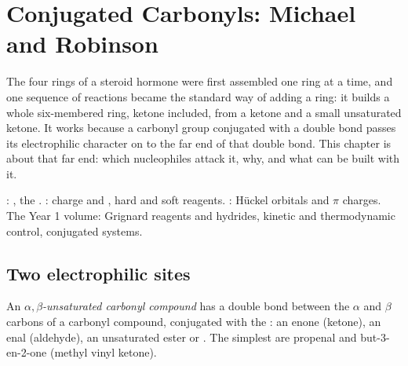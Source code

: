 \chapter{Conjugated Carbonyls: Michael and Robinson}\label{ch:b2:conjugate-additions}

The four rings of a steroid hormone were first assembled one ring at a time, and one sequence of
reactions became the standard way of adding a ring: it builds a whole six-membered ring, ketone
included, from a ketone and a small unsaturated ketone. It works because a carbonyl group conjugated
with a  double bond passes its electrophilic character on to the far end of that double bond.
This chapter is about that far end: which nucleophiles attack it, why, and what can be built with it.

\begin{recall}
: , the . : charge
and , hard and soft reagents. : Hückel orbitals and $\pi$ charges.
The Year 1 volume: Grignard reagents and hydrides, kinetic and thermodynamic control, conjugated
systems.
\end{recall}

\section{Two electrophilic sites}

\begin{definition}\label{def:b2:conjugate-additions:enone}
An \emph{$\alpha,\beta$-unsaturated carbonyl compound}
has a  double bond between the $\alpha$
and $\beta$ carbons of a carbonyl compound, conjugated with the : an enone (ketone), an enal
(aldehyde), an unsaturated ester or . The simplest are propenal  and
but-3-en-2-one  (methyl vinyl ketone).
\end{definition}

